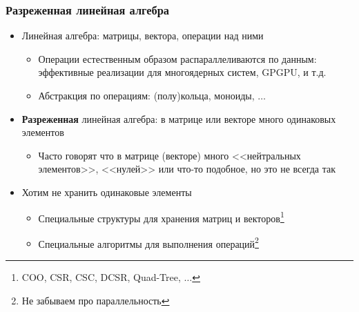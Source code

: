 \documentclass[xcolor=table,aspectratio=169]{beamer}
\begin{document}
\begin{frame}[fragile]
  \frametitle{Разреженная линейная алгебра}
  \begin{itemize}
    \item Линейная алгебра: матрицы, вектора, операции над ними
    \begin{itemize}
      \item Операции естественным образом распараллеливаются по данным: эффективные реализации для многоядерных систем, GPGPU, и т.д.
      \item Абстракция по операциям: (полу)кольца, моноиды, $\ldots$
    \end{itemize}
    \item \textbf{Разреженная} линейная алгебра: в матрице или векторе много одинаковых элементов
    \begin{itemize}
      \item Часто говорят что в матрице (векторе) много <<нейтральных элементов>>, <<нулей>> или что-то подобное, но это не всегда так
    \end{itemize}
    \item Хотим не хранить одинаковые элементы
    \begin{itemize}
      \item Специальные структуры для хранения матриц и векторов\footnote{COO, CSR, CSC, DCSR, Quad-Tree, $\ldots$}
      \item Специальные алгоритмы для выполнения операций\footnote{Не забываем про параллельность}
    \end{itemize}
  \end{itemize}
\end{frame}
\end{document}
